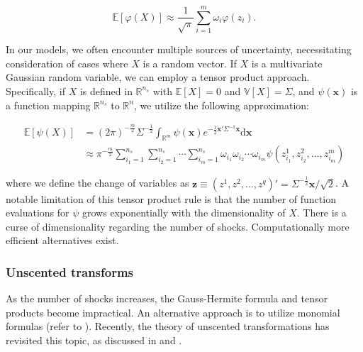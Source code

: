 \documentclass[a4paper,12pt]{amsart}
\begin{document}
\[
   \mathbb{E}[\varphi(X)] \approx \frac{1}{\sqrt{\pi}} \sum_{i=1}^m \omega_i \varphi(z_i).
\]

In our models, we often encounter multiple sources of uncertainty,
necessitating consideration of cases where $X$ is a random
vector. If $X$ is a multivariate Gaussian random variable, we can
employ a tensor product approach. Specifically, if $X$ is defined
in $\mathbb{R}^{n_s}$ with $\mathbb{E}[X] = 0$
and $\mathbb{V}[X] = \Sigma$, and $\psi(\mathbf{x})$ is a function
mapping $\mathbb{R}^{n_s}$ to $\mathbb{R}^n$, we utilize the following
approximation:

\[
   \begin{split}
      \mathbb{E}[\psi(X)] & =(2\pi)^{-\frac{m}{2}} \Sigma^{-\frac{1}{2}} \int_{\mathbb{R}^m} \psi(\mathbf{x}) e^{-\frac{1}{2} \mathbf{x}' \Sigma^{-1} \mathbf{x}} \mathrm{d}\mathbf{x}                             \\
                          & \approx \pi^{-\frac{m}{2}} \sum_{i_1=1}^{n_s} \sum_{i_2=1}^{n_s} \cdots \sum_{i_m=1}^{n_s} \omega_{i_1} \omega_{i_2} \cdots \omega_{i_m} \psi(z_{i_1}^1, z_{i_2}^2, \ldots, z_{i_m}^m)
   \end{split}
\]

where we define the change of variables
as
$\mathbf{z} \equiv (z^1, z^2, \ldots, z^q)' = \Sigma^{-\frac{1}{2}} \mathbf{x} / \sqrt{2}$. A
notable limitation of this tensor product rule is that the number of
function evaluations for $\psi$ grows exponentially with the
dimensionality of $X$. There is a curse of dimensionality regarding
the number of shocks. Computationally more efficient
alternatives exist.\newline


\subsubsection{Unscented transforms}

As the number of shocks increases, the Gauss-Hermite formula and
tensor products become impractical. An alternative approach is to
utilize monomial formulas (refer to \textcite{Stroud1971}). Recently,
the theory of unscented transformations has revisited this topic, as
discussed in \textcite{Julier2000} and \textcite{Julier2002}.\newline
\end{document}
